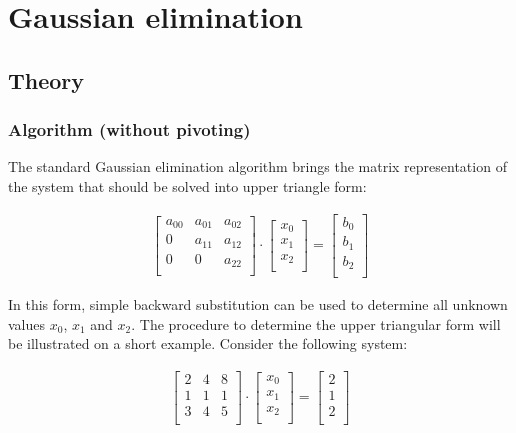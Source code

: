 \newpage
\section{Gaussian elimination}
\label{sec:gaussianElimination}
\subsection{Theory}

\subsubsection{Algorithm (without pivoting)}
The standard Gaussian elimination algorithm brings the matrix representation of the system that should be solved into upper triangle form:


\begin{align}
\label{eq:gauss3x3upperTriangle}
\begin{bmatrix}
a_{00}&a_{01}&a_{02}\\
0&a_{11}&a_{12}\\
0&0&a_{22}\\
\end{bmatrix}
\cdot
\begin{bmatrix}
x_0\\
x_1\\
x_2\\
\end{bmatrix}
=
\begin{bmatrix}
b_0\\
b_1\\
b_2\\
\end{bmatrix}
\end{align}

In this form, simple backward substitution can be used to determine all unknown values $x_0$, $x_1$ and $x_2$.
The procedure to determine the upper triangular form will be illustrated on a short example.
Consider the following system:

\begin{align}
\label{eq:gauss3x3unmodified}
\begin{bmatrix}
	2&4&8\\
	1&1&1\\
	3&4&5\\
\end{bmatrix}
\cdot
\begin{bmatrix}
x_0\\
x_1\\
x_2\\
\end{bmatrix}
=
\begin{bmatrix}
2\\
1\\
2\\
\end{bmatrix}
\end{align}

